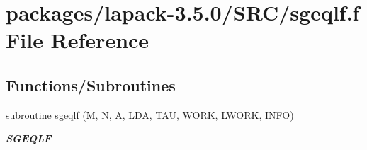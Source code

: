 \hypertarget{sgeqlf_8f}{}\section{packages/lapack-\/3.5.0/\+S\+R\+C/sgeqlf.f File Reference}
\label{sgeqlf_8f}
\subsection*{Functions/\+Subroutines}
\begin{DoxyCompactItemize}
\item 
subroutine \hyperlink{group__realGEcomputational_ga2e9ace4615da2fb5201a1bdeff3ad15c}{sgeqlf} (M, \hyperlink{polmisc_8c_a0240ac851181b84ac374872dc5434ee4}{N}, \hyperlink{classA}{A}, \hyperlink{example__user_8c_ae946da542ce0db94dced19b2ecefd1aa}{L\+D\+A}, T\+A\+U, W\+O\+R\+K, L\+W\+O\+R\+K, I\+N\+F\+O)
\begin{DoxyCompactList}\small\item\em {\bfseries S\+G\+E\+Q\+L\+F} \end{DoxyCompactList}\end{DoxyCompactItemize}

